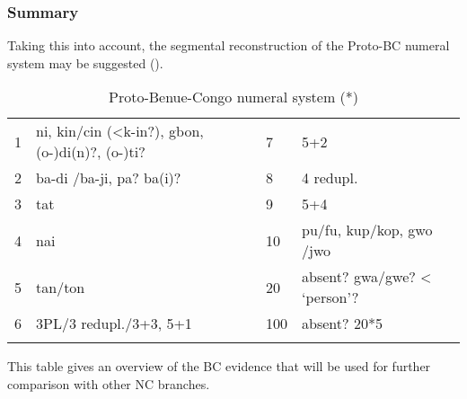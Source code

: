 \subsubsection{Summary}
Taking this into account, the segmental reconstruction of the Proto-BC numeral system may be suggested ().

\begin{table}
\caption{\label{tab:3:64}Proto-Benue-Congo numeral system (*)}


\begin{tabularx}{\textwidth}{lXll}
\lsptoprule

{1} & ni, kin/cin (<k-in?), gbon,\newline (o-)di(n)?, (o-)ti? & {7} & 5+2\\
{2} & ba-di /ba-ji, pa? ba(i)? & {8} & 4 redupl.\\
{3} & tat & {9} & 5+4\\
{4} & nai & {10} & pu/fu, kup/kop, gwo /jwo\\
{5} & tan/ton & {20} & absent? gwa/gwe? < ‘person’?\\
{6} & 3PL/3 redupl./3+3, 5+1 & {100} & absent? 20*5\\
\lspbottomrule
\end{tabularx}
\end{table}

This table gives an overview of the BC evidence that will be used for further comparison with other NC branches. 

